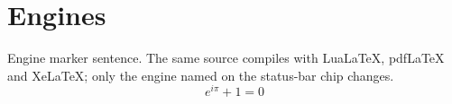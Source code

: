 \documentclass{article}
\begin{document}
\section{Engines}
Engine marker sentence. The same source compiles with LuaLaTeX, pdfLaTeX and
XeLaTeX; only the engine named on the status-bar chip changes.
\[ e^{i\pi} + 1 = 0 \]
\end{document}
